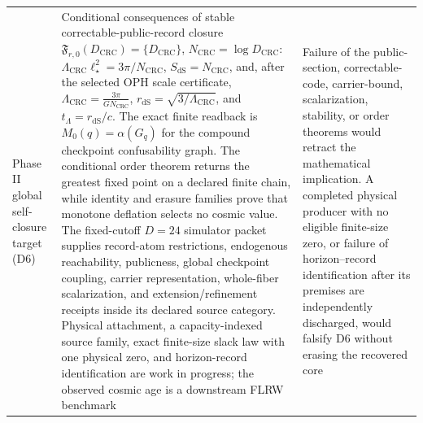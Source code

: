 \documentclass[11pt]{article}
\begin{document}
\begin{longtable}{@{}>{\raggedright\arraybackslash}p{}>{\raggedright\arraybackslash}p{}>{\raggedright\arraybackslash}p{}@{}}
Phase II global self-closure target (D6) & Conditional consequences of stable correctable-public-record closure \(\mathfrak F_{r,0}(D_{\mathrm{CRC}})=\{D_{\mathrm{CRC}}\}\), \(N_{\mathrm{CRC}}=\log D_{\mathrm{CRC}}\): \(\Lambda_{\mathrm{CRC}}\ell_\star^2=3\pi/N_{\mathrm{CRC}}\), \(S_{\mathrm{dS}}=N_{\mathrm{CRC}}\), and, after the selected OPH scale certificate, \(\Lambda_{\mathrm{CRC}}=\frac{3\pi}{G N_{\mathrm{CRC}}}\), \(r_{\mathrm{dS}}=\sqrt{3/\Lambda_{\mathrm{CRC}}}\), and \(t_\Lambda=r_{\mathrm{dS}}/c\). The exact finite readback is \(M_0(q)=\alpha(G_q)\) for the compound checkpoint confusability graph. The conditional order theorem returns the greatest fixed point on a declared finite chain, while identity and erasure families prove that monotone deflation selects no cosmic value. The fixed-cutoff \(D=24\) simulator packet supplies record-atom restrictions, endogenous reachability, publicness, global checkpoint coupling, carrier representation, whole-fiber scalarization, and extension/refinement receipts inside its declared source category. Physical attachment, a capacity-indexed source family, exact finite-size slack law with one physical zero, and horizon-record identification are work in progress; the observed cosmic age is a downstream FLRW benchmark & Failure of the public-section, correctable-code, carrier-bound, scalarization, stability, or order theorems would retract the mathematical implication. A completed physical producer with no eligible finite-size zero, or failure of horizon--record identification after its premises are independently discharged, would falsify D6 without erasing the recovered core \\

\end{longtable}
\end{document}
